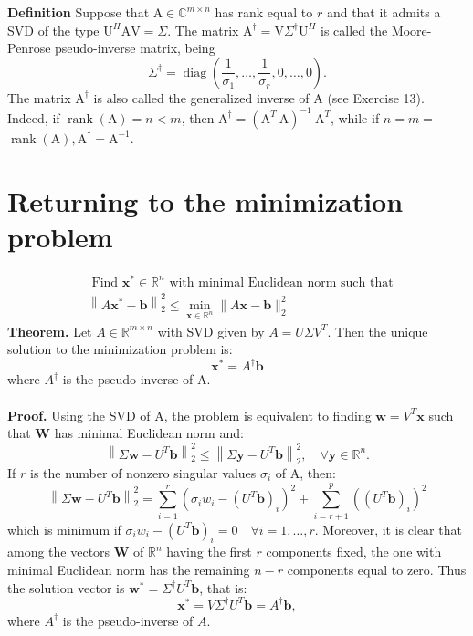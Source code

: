 \documentclass[11pt]{book}
\begin{document}
\textbf{Definition} Suppose that $\mathrm{A} \in \mathbb{C}^{m \times n}$ has rank equal to $r$ and that it admits a SVD of the type $\mathrm{U}^H \mathrm{AV}=\Sigma$. The matrix $\mathrm{A}^{\dagger}=\mathrm{V} \Sigma^{\dagger} \mathrm{U}^H$ is called the Moore-Penrose pseudo-inverse matrix, being
$$
\Sigma^{\dagger}=\operatorname{diag}\left(\frac{1}{\sigma_1}, \ldots, \frac{1}{\sigma_r}, 0, \ldots, 0\right) .
$$
The matrix $\mathrm{A}^{\dagger}$ is also called the generalized inverse of $\mathrm{A}$ (see Exercise 13). Indeed, if $\operatorname{rank}(\mathrm{A})=n<m$, then $\mathrm{A}^{\dagger}=\left(\mathrm{A}^T \mathrm{~A}\right)^{-1} \mathrm{~A}^T$, while if $n=m=$ $\operatorname{rank}(\mathrm{A}), \mathrm{A}^{\dagger}=\mathrm{A}^{-1}$. 
\section*{Returning to the minimization problem}
$$
\boxed{
\begin{aligned}
& \text { Find } \mathbf{x}^{*} \in \mathbb{R}^{n} \text { with minimal Euclidean norm such that } \\
& \left\|A \mathbf{x}^{*}-\mathbf{b}\right\|_{2}^{2} \leq \min _{\mathbf{x} \in \mathbb{R}^{n}}\|A \mathbf{x}-\mathbf{b}\|_{2}^{2}
\end{aligned}
}
$$
\textbf{Theorem.} Let $A \in \mathbb{R}^{m \times n}$ with SVD given by $A=U \Sigma V^{T}$. Then the unique solution to the minimization problem is:
$$
\mathbf{x}^{*}=A^{\dagger} \mathbf{b}
$$
where $A^{\dagger}$ is the pseudo-inverse of $\mathrm{A}$.\\ \\
\textbf{Proof.} Using the SVD of A, the problem is equivalent to finding $\mathbf{w}=V^{T} \mathbf{x}$ such that $\mathbf{W}$ has minimal Euclidean norm and:
$$
\left\|\Sigma \mathbf{w}-U^{T} \mathbf{b}\right\|_{2}^{2} \leq\left\|\Sigma \mathbf{y}-U^{T} \mathbf{b}\right\|_{2}^{2}, \quad \forall \mathbf{y} \in \mathbb{R}^{n} .
$$
If $r$ is the number of nonzero singular values $\sigma_{i}$ of $\mathrm{A}$, then:
$$
\left\|\Sigma \mathbf{w}-U^{T} \mathbf{b}\right\|_{2}^{2}=\sum_{i=1}^{r}\left(\sigma_{i} w_{i}-\left(U^{T} \mathbf{b}\right)_{i}\right)^{2}+\sum_{i=r+1}^{p}\left(\left(U^{T} \mathbf{b}\right)_{i}\right)^{2}
$$
which is minimum if $\sigma_{i} w_{i}-\left(U^{T} \mathbf{b}\right)_{i}=0 \quad \forall i=1, \ldots, r$. Moreover, it is clear that among the vectors $\mathbf{W}$ of $\mathbb{R}^{n}$ having the first $r$ components fixed, the one with minimal Euclidean norm has the remaining $n-r$ components equal to zero. Thus the solution vector is $\mathbf{w}^{*}=\Sigma^{\dagger} U^{T} \mathbf{b}$, that is:
$$
\mathbf{x}^{*}=V \Sigma^{\dagger} U^{T} \mathbf{b}=A^{\dagger} \mathbf{b},
$$
where $A^{\dagger}$ is the pseudo-inverse of $A$.
\end{document}
